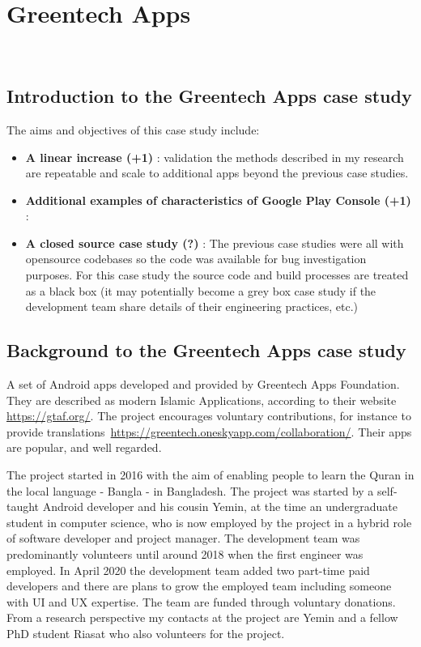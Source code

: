 \section{Greentech Apps}~\label{section-greentech-apps}

\subsection{Introduction to the Greentech Apps case study}
The aims and objectives of this case study include:

\begin{itemize}
    \item \textbf{A linear increase (+1)} : validation the methods described in my research are repeatable and scale to additional apps beyond the previous case studies.
    \item \textbf{Additional examples of characteristics of Google Play Console (+1)} :
    \item \textbf{A closed source case study (?)} : The previous case studies were all with opensource codebases so the code was available for bug investigation purposes. For this case study the source code and build processes are treated as a black box (it may potentially become a grey box case study if the development team share details of their engineering practices, etc.)
\end{itemize}

\subsection{Background to the Greentech Apps case study}
A set of Android apps developed and provided by Greentech Apps Foundation. They are described as modern Islamic Applications, according to their website \url{https://gtaf.org/}. The project encourages voluntary contributions, for instance to provide translations~\url{https://greentech.oneskyapp.com/collaboration/}. Their apps are popular, and well regarded. %


The project started in 2016 with the aim of enabling people to learn the Quran in the local language - Bangla - in Bangladesh. The project was started by a self-taught Android developer and his cousin Yemin, at the time an undergraduate student in computer science, who is now employed by the project in a hybrid role of software developer and project manager. The development team was predominantly volunteers until around 2018 when the first engineer was employed. In April 2020 the development team added two part-time paid developers and there are plans to grow the employed team including someone with UI and UX expertise. The team are funded through voluntary donations. From a research perspective my contacts at the project are Yemin and a fellow PhD student Riasat who also volunteers for the project.

